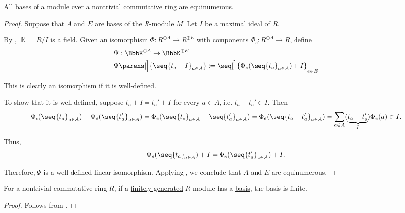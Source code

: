 \begin{proposition}\label{thm:commutative_module_rank}
  All \hyperref[def:hamel_basis]{bases} of a \hyperref[def:module]{module} over a nontrivial \hyperref[def:ring/commutative]{commutative ring} are \hyperref[def:equinumerosity]{equinumerous}.
\end{proposition}
\begin{proof}
  Suppose that \( A \) and \( E \) are bases of the \( R \)-module \( M \). Let \( I \) be a \hyperref[def:semiring_ideal/maximal]{maximal ideal} of \( R \).

  By , \( \BbbK = R / I \) is a field. Given an isomorphism \( \Phi: R^{\oplus A} \to R^{\oplus E} \) with components \( \Phi_e: R^{\oplus A} \to R \), define
  \begin{equation*}
    \begin{aligned}
      &\Psi: \BbbK^{\oplus A} \to \BbbK^{\oplus E} \\
      &\Psi\parens[\Big]{ \seq{ t_a + I }_{a \in A} } \coloneqq \seq[\Big]{ \Phi_e(\seq{ t_a }_{a \in A}) + I }_{e \in E}
    \end{aligned}
  \end{equation*}

  This is clearly an isomorphism if it is well-defined.

  To show that it is well-defined, suppose \( t_a + I = t_a' + I \) for every \( a \in A \), i.e. \( t_a - t_a' \in I \). Then
  \small
  \begin{equation*}
    \Phi_e(\seq{ t_a }_{a \in A}) - \Phi_e(\seq{ t_a' }_{a \in A})
    =
    \Phi_e(\seq{ t_a }_{a \in A} - \seq{ t_a' }_{a \in A})
    =
    \Phi_e(\seq{ t_a - t_a' }_{a \in A})
    =
    \sum_{a \in A} (\underbrace{ t_a - t_a' }_I) \Phi_e(a)
    \in
    I.
  \end{equation*}
  \normalsize

  Thus,
  \begin{equation*}
    \Phi_e(\seq{ t_a }_{a \in A}) + I = \Phi_e(\seq{ t_a' }_{a \in A}) + I.
  \end{equation*}

  Therefore, \( \Psi \) is a well-defined linear isomorphism. Applying , we conclude that \( A \) and \( E \) are equinumerous.
\end{proof}

\begin{corollary}\label{thm:finitely_generated_module_basis}
  For a nontrivial commutative ring \( R \), if a \hyperref[def:semimodule/generated]{finitely generated} \( R \)-module has a \hyperref[def:hamel_basis]{basis}, the basis is finite.
\end{corollary}
\begin{proof}
  Follows from .
\end{proof}

